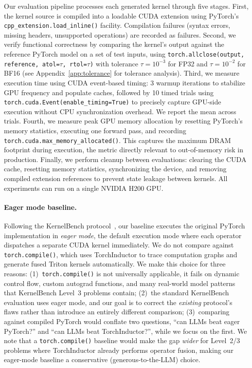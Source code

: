 \documentclass[11pt]{article}
\begin{document}
Our evaluation pipeline processes each generated kernel through five stages. First, the kernel source is compiled into a loadable CUDA extension using PyTorch's \texttt{cpp\_extension.load\_inline()} facility. Compilation failures (syntax errors, missing headers, unsupported operations) are recorded as failures. Second, we verify functional correctness by comparing the kernel's output against the reference PyTorch model on a set of test inputs, using \texttt{torch.allclose(output, reference, atol=$\tau$, rtol=$\tau$)} with tolerance $\tau = 10^{-3}$ for FP32 and $\tau = 10^{-2}$ for BF16 (see Appendix~\ref{app:tolerance} for tolerance analysis). Third, we measure execution time using CUDA event-based timing: 3 warmup iterations to stabilize GPU frequency and populate caches, followed by 10 timed trials using \texttt{torch.cuda.Event(enable\_timing=True)} to precisely capture GPU-side execution without CPU synchronization overhead. We report the mean across trials. Fourth, we measure peak GPU memory allocation by resetting PyTorch's memory statistics, executing one forward pass, and recording \texttt{torch.cuda.max\_memory\_allocated()}. This captures the maximum DRAM footprint during execution, the metric directly relevant to out-of-memory risk in production. Finally, we perform cleanup between evaluations: clearing the CUDA cache, resetting memory statistics, synchronizing the device, and removing compiled extension references to prevent state leakage between kernels.
All experiments can run on a single NVIDIA H200 GPU.

\paragraph{Eager mode baseline.} Following the KernelBench protocol~\cite{kernelbench}, our baseline executes the original PyTorch implementation in \emph{eager mode}, the default execution mode where each operator dispatches a separate CUDA kernel immediately. We do not compare against \texttt{torch.compile()}, which uses TorchInductor to trace computation graphs and generate fused Triton kernels automatically. We make this choice for three reasons: (1)~\texttt{torch.compile()} is not universally applicable, it fails on dynamic control flow, custom autograd functions, and many real-world model patterns that KernelBench Level~3 problems contain; (2)~the standard KernelBench evaluation uses eager mode, and our goal is to correct the \emph{existing} protocol's flaws rather than introduce an entirely different comparison; (3)~comparing against compiled PyTorch would conflate two questions, ``can LLMs beat eager PyTorch?'' and ``can LLMs beat TorchInductor?'', while we focus on the first. We note that a \texttt{torch.compile()} baseline would make the gap \emph{wider} for Level~2/3 problems where TorchInductor already performs operator fusion, making our eager-mode baseline a conservative (generous-to-the-LLM) choice.
\end{document}
